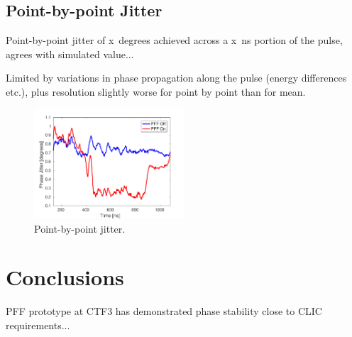 \documentclass[%
 reprint,
 amsmath,amssymb,
 aps,
]{revtex4-1}
\begin{document}
\subsection{\label{ss:pbpJit}Point-by-point Jitter}

Point-by-point jitter of x~degrees achieved across a x~ns portion of the pulse, agrees with simulated value...

Limited by variations in phase propagation along the pulse (energy differences etc.), plus resolution slightly worse for point by point than for mean.

\begin{figure}
\includegraphics[width=0.5\textwidth]{figs/BestFF_pbp}%
\caption{\label{fig:BestFF_pbp}Point-by-point jitter.}
\end{figure}


\section{\label{s:conc}Conclusions}

PFF prototype at CTF3 has demonstrated phase stability close to CLIC requirements...

\end{document}
